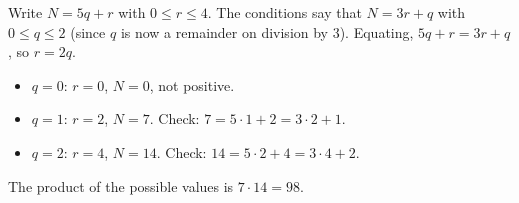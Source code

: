 Write $N=5q+r$ with $0\le r\le4$. The conditions say that $N=3r+q$ with $0\le q\le2$ (since $q$ is now a remainder on division by $3$). Equating, $5q+r=3r+q$, so $r=2q$.
\begin{itemize}
\item $q=0$: $r=0$, $N=0$, not positive.
\item $q=1$: $r=2$, $N=7$. Check: $7=5\cdot1+2=3\cdot2+1$.
\item $q=2$: $r=4$, $N=14$. Check: $14=5\cdot2+4=3\cdot4+2$.
\end{itemize}
The product of the possible values is $7\cdot14=\boxed{98}$.
